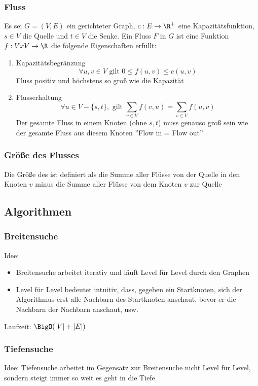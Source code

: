 	\subsubsection{Fluss}
		Es sei $G=(V,E)$ ein gerichteter Graph, $c:E\to \R^+$ eine Kapazitätsfunktion, $s\in V$ die Quelle und $t\in V$ die Senke. Ein Fluss $F$ in $G$ ist eine Funktion $f:VxV\to \R$ die folgende Eigenschaften erfüllt:
			\begin{enumerate}
			  \item Kapazitätsbegränzung 
			  	$$
			  		\forall u,v\in V \text{ gilt } 0\leq f(u,v)\leq c(u,v)
			  	$$
			  	Fluss positiv und höchstens so groß wie die Kapazität
			  	\item Flusserhaltung
			  	$$
			  		\forall u\in V-\{s,t\}, \text{ gilt } \displaystyle\sum_{v \in V}f(v,u)=\displaystyle\sum_{v\in V}f(u,v)
			  	$$
			  	Der gesamte Fluss in einem Knoten (ohne $s,t$) muss genauso groß sein wie der gesamte Fluss aus diesem Knoten ''Flow in = Flow out'' 
			\end{enumerate}
			\subsubsection{Größe des Flusses}
			Die Größe des ist definiert als die Summe aller Flüsse von der Quelle in den Knoten $v$ minus die Summe aller Flüsse von dem Knoten $v$ zur Quelle

	\subsection{Algorithmen}
	\subsubsection{Breitensuche}
		Idee: 
		\begin{itemize}
		  \item Breitensuche arbeitet iterativ und läuft Level für Level durch den Graphen
		  \item Level für Level bedeutet intuitiv, dass, gegeben ein Startknoten, sich der Algorithmus erst alle Nachbarn des Startknoten anschaut, bevor er die Nachbarn der Nachbarn anschaut, usw.
		\end{itemize}
		Laufzeit: $\BigO(|V|+|E|)$
	\subsubsection{Tiefensuche}
		Idee: Tiefensuche arbeitet im Gegensatz zur Breitensuche nicht Level für Level, sondern steigt immer so weit es geht in die Tiefe
